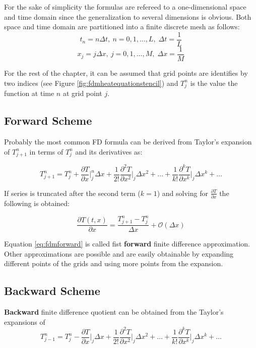 For the sake of simplicity the formulas are refereed to a one-dimensional space and time domain since the generalization to several dimensions is obvious.
Both space and time domain are partitioned into a finite discrete mesh as follows:    
 \begin{equation}
    		t_n = n\Delta t, \: n = 0,1,\ldots,L,\; \Delta t= \frac{1}{L}
    \end{equation}
    \begin{equation}
    		x_j = j\Delta x, \: j = 0,1,\ldots,M,\;\Delta x = \frac{1}{M}
    \end{equation}

For the rest of the chapter, it can be assumed that grid points are identifies by two indices (see Figure \ref{fig:fdmheatequationstencil}) and $T_j^n$ is the value the function at time $n$ at grid point $j$.

\subsection{Forward Scheme}
    Probably the most common FD formula can be derived from Taylor's expansion of $T^n_{j+1}$ in terms of $T^n_{j}$ and its derivatives as:
    
    \begin{equation}
    T^n_{j+1} = T^n_{j} +
    \frac{\partial T}{\partial x}\bigg\rvert^n_j \Delta x +
    \frac{1}{2!}  \frac{\partial^2 T}{\partial x^2}\bigg\rvert_j \Delta x^2 + \ldots + 
     \frac{1}{k!}  \frac{\partial^k T}{\partial x^k}\bigg\rvert_j \Delta x^k + \ldots
     \label{eq:taylorexp1}
    \end{equation}
    
    If series is truncated after the second term ($k=1$) and solving for $\frac{\partial T}{\partial x}$ the following is obtained:
    
    \begin{equation}
    \frac{\partial T(t,x)}{\partial x}  = \frac{T^n_{j+1} - T^n_{j}}{\Delta x} + \mathcal{O}(\Delta x)
    \label{eq:fdmforward}
    \end{equation}
    
    Equation \ref{eq:fdmforward} is called fist \textbf{forward} finite difference approximation. Other approximations are possible and are easily obtainable by expanding different points of the grids and using more points from the expansion.
    
  \subsection{Backward Scheme}  
    \textbf{Backward} finite difference quotient can be obtained from the Taylor's expansions of    
        \begin{equation}
    T^n_{j-1} = T^n_{j} - 
    \frac{\partial T}{\partial x}\bigg\rvert_j \Delta x +
    \frac{1}{2!}  \frac{\partial^2 T}{\partial x^2}\bigg\rvert_j \Delta x^2 + \ldots + 
     \frac{1}{k!}  \frac{\partial^k T}{\partial x^k}\bigg\rvert_j \Delta x^k + \ldots
     \label{eq:taylorexp2}
    \end{equation}
    
